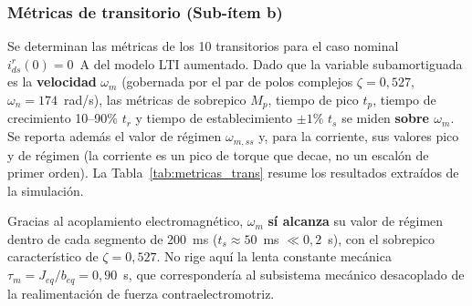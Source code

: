 \documentclass[12pt, a4paper,journal, onecolumn, compsoc]{IEEEtran}
\begin{document}
\subsubsection{Métricas de transitorio (Sub-ítem b)}
\label{sec:sim_item_b}

Se determinan las métricas de los 10 transitorios para el caso nominal $i_{ds}^r(0) = 0$~A del modelo LTI aumentado. Dado que la variable subamortiguada es la \textbf{velocidad} $\omega_m$ (gobernada por el par de polos complejos $\zeta = 0{,}527$, $\omega_n = 174$~rad/s), las métricas de sobrepico $M_p$, tiempo de pico $t_p$, tiempo de crecimiento 10--90\% $t_r$ y tiempo de establecimiento $\pm 1\%$ $t_s$ se miden \textbf{sobre $\omega_m$}. Se reporta además el valor de régimen $\omega_{m,ss}$ y, para la corriente, sus valores pico y de régimen (la corriente es un pico de torque que decae, no un escalón de primer orden). La Tabla~\ref{tab:metricas_trans} resume los resultados extraídos de la simulación.

Gracias al acoplamiento electromagnético, $\omega_m$ \textbf{sí alcanza} su valor de régimen dentro de cada segmento de 200~ms ($t_s \approx 50$~ms $\ll 0{,}2$~s), con el sobrepico característico de $\zeta = 0{,}527$. No rige aquí la lenta constante mecánica $\tau_m = J_{eq}/b_{eq} = 0{,}90$~s, que correspondería al subsistema mecánico desacoplado de la realimentación de fuerza contraelectromotriz.
\end{document}
